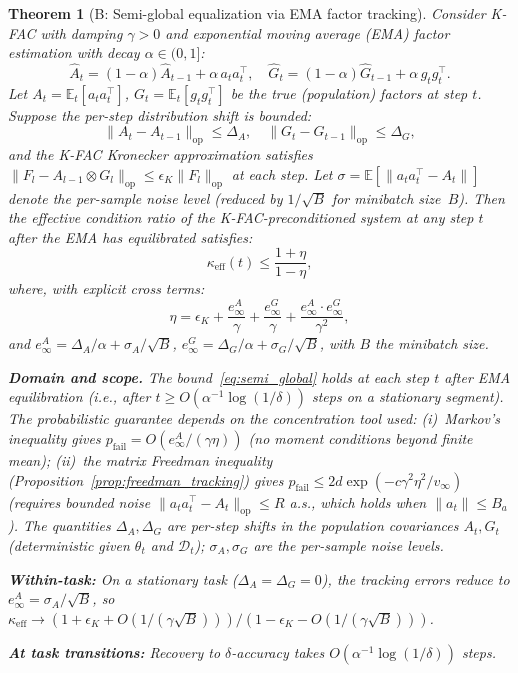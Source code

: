 \documentclass{article}
\providecommand{\E}{\mathbb{E}}
\providecommand{\norm}[1]{\lVert #1 \rVert}
\theoremstyle{plain}
\newtheorem{theorem}{Theorem}
\theoremstyle{definition}
\theoremstyle{remark}
\begin{document}
\begin{theorem}[B: Semi-global equalization via EMA factor tracking]
\label{thm:tracking}
Consider K-FAC with damping $\gamma > 0$ and exponential moving average (EMA) factor estimation with decay $\alpha \in (0,1]$:
\begin{equation}
    \hat{A}_t = (1 - \alpha)\hat{A}_{t-1} + \alpha\, a_t a_t^\top, \quad
    \hat{G}_t = (1 - \alpha)\hat{G}_{t-1} + \alpha\, g_t g_t^\top.
\end{equation}
Let $A_t = \E_t[a_t a_t^\top]$, $G_t = \E_t[g_t g_t^\top]$ be the true (population) factors at step $t$. Suppose the per-step distribution shift is bounded:
\begin{equation}
\label{eq:shift_bound}
    \norm{A_t - A_{t-1}}_{\mathrm{op}} \leq \Delta_A, \quad \norm{G_t - G_{t-1}}_{\mathrm{op}} \leq \Delta_G,
\end{equation}
and the K-FAC Kronecker approximation satisfies $\norm{F_l - A_{l-1} \otimes G_l}_{\mathrm{op}} \leq \epsilon_K\norm{F_l}_{\mathrm{op}}$ at each step. Let $\sigma = \E[\norm{a_t a_t^\top - A_t}]$ denote the per-sample noise level (reduced by $1/\sqrt{B}$ for minibatch size~$B$). Then the \emph{effective condition ratio} of the K-FAC-preconditioned system at any step $t$ after the EMA has equilibrated satisfies:
\begin{equation}
\label{eq:semi_global}
    \kappa_{\mathrm{eff}}(t) \leq \frac{1 + \eta}{1 - \eta},
\end{equation}
where, with explicit cross terms:
\begin{equation}
\label{eq:eta_full}
    \eta = \epsilon_K + \frac{e_\infty^A}{\gamma} + \frac{e_\infty^G}{\gamma} + \frac{e_\infty^A \cdot e_\infty^G}{\gamma^2},
\end{equation}
and $e_\infty^A = \Delta_A/\alpha + \sigma_A/\sqrt{B}$, $e_\infty^G = \Delta_G/\alpha + \sigma_G/\sqrt{B}$, with $B$ the minibatch size.

\textbf{Domain and scope.} The bound~\eqref{eq:semi_global} holds at each step $t$ \emph{after EMA equilibration} (i.e., after $t \geq O(\alpha^{-1}\log(1/\delta))$ steps on a stationary segment). The probabilistic guarantee depends on the concentration tool used: (i)~Markov's inequality gives $p_{\mathrm{fail}} = O(e_\infty^A/(\gamma\eta))$ (no moment conditions beyond finite mean); (ii)~the matrix Freedman inequality (Proposition~\ref{prop:freedman_tracking}) gives $p_{\mathrm{fail}} \leq 2d\exp(-c\gamma^2\eta^2/v_\infty)$ (requires bounded noise $\norm{a_t a_t^\top - A_t}_{\mathrm{op}} \leq R$ a.s., which holds when $\norm{a_t} \leq B_a$). The quantities $\Delta_A, \Delta_G$ are \emph{per-step} shifts in the \emph{population} covariances $A_t, G_t$ (deterministic given $\theta_t$ and $\mathcal{D}_t$); $\sigma_A, \sigma_G$ are the per-sample noise levels.

\textbf{Within-task:} On a stationary task ($\Delta_A = \Delta_G = 0$), the tracking errors reduce to $e_\infty^A = \sigma_A/\sqrt{B}$, so $\kappa_{\mathrm{eff}} \to (1 + \epsilon_K + O(1/(\gamma\sqrt{B})))/(1 - \epsilon_K - O(1/(\gamma\sqrt{B})))$.

\textbf{At task transitions:} Recovery to $\delta$-accuracy takes $O(\alpha^{-1}\log(1/\delta))$ steps.
\end{theorem}
\end{document}
